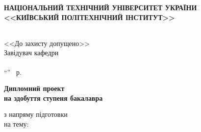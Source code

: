 \documentclass[main.tex]{subfiles}
\begin{document}
\begin{specialpage}
  \MakeUppercase{\textbf{Національний технічний університет України <<Київський політехнічний інститут>>}}\\
  \vspace{2mm}
  \underline{}\\
  \vspace{2mm}
  \underline{}

  \vspace{1cm}

  \hfill\begin{minipage}{0.35\linewidth}
  \begin{flushleft}
      <<До захисту допущено>>\\
      Завідувач кафедри\\
      \fillin[(підпис)]{\hspace{2.2cm}} \\
      ``\fillin{\phantom{99}}''\fillin{\hspace{3cm}} ~р.
  \end{flushleft}
  \end{minipage}

  \vspace{1cm}

  \textbf{\Large Дипломний проект}\\
  \textbf{на здобуття ступеня бакалавра}\\
  \begin{flushleft}
  з напряму підготовки \uline{\hfill\mbox{}}\\
  на тему: \\
  \\
  \uline{\mbox{}\hfill\mbox{}}

  \vspace{1cm}


\end{flushleft}
\end{specialpage}
\end{document}
